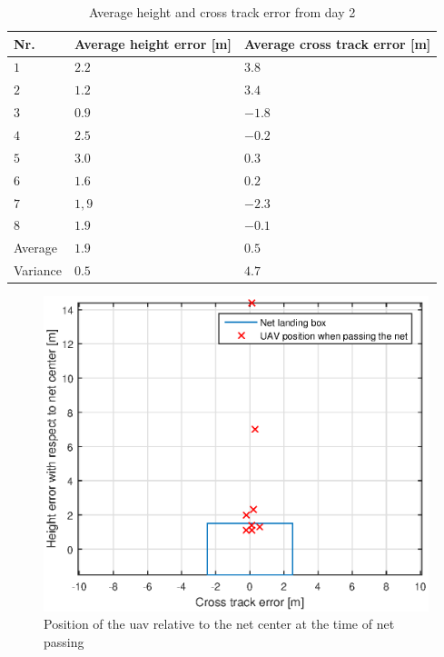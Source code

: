 \begin{table}[H]
\centering
\begin{tabular}{| l | l | l |}
\hline
\textbf{Nr.} 	& \textbf{Average height error [m]} 	& \textbf{Average cross track error [m]}  \\ \hline
$1$				& $2.2$							& $3.8$										\\ \hline
$2$				& $1.2$							& $3.4$										\\ \hline
$3$				& $0.9$							& $-1.8$									\\ \hline
$4$				& $2.5$							& $-0.2$									\\ \hline
$5$				& $3.0$							& $0.3$										\\ \hline
$6$				& $1.6$							& $0.2$										\\ \hline
$7$				& $1,9$							& $-2.3$									\\ \hline
$8$				& $1.9$							& $-0.1$									\\ \hline
Average			& $1.9$							& $0.5$										\\ \hline
Variance		& $0.5$							& $4.7$										\\ \hline
\end{tabular}
\caption{Average height and cross track error from day 2}
\label{Tb:AverageCrossHeightDay2}
\end{table}
\begin{figure}[H]
\centering
\includegraphics[scale=0.7]{figs/Experiment/day2NetHit.eps}
\caption{Position of the \gls{uav} relative to the net center at the time of net passing}
\label{Fig:Day2NetPass}
\end{figure}
